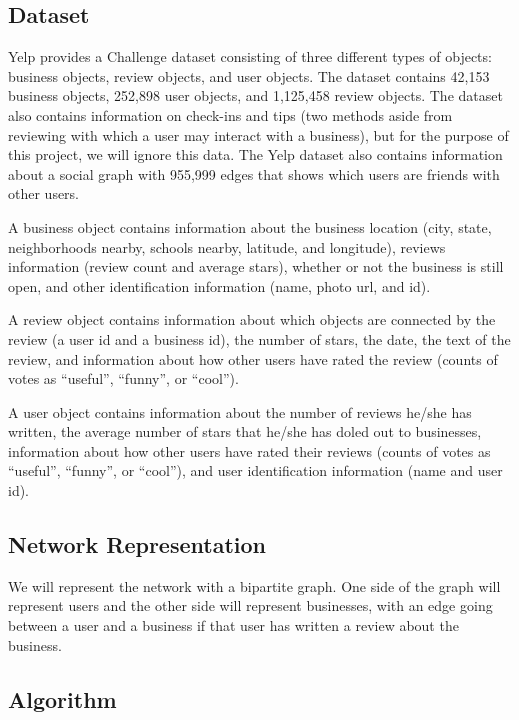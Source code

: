 \documentclass[11pt]{article}
\begin{document}
\subsection{Dataset}
Yelp provides a Challenge dataset consisting of three different types of objects: business objects, review objects, and user objects.  The dataset contains 42,153 business objects, 252,898 user objects, and 1,125,458 review objects.  The dataset also contains information on check-ins and tips (two methods aside from reviewing with which a user may interact with a business), but for the purpose of this project, we will ignore this data.  The Yelp dataset also contains information about a social graph with 955,999 edges that shows which users are friends with other users.\\
\par
A business object contains information about the business location (city, state, neighborhoods nearby, schools nearby, latitude, and longitude), reviews information (review count and average stars), whether or not the business is still open, and other identification information (name, photo url, and id).\\
\par
A review object contains information about which objects are connected by the review (a user id and a business id), the number of stars, the date, the text of the review, and information about how other users have rated the review (counts of votes as ``useful'', ``funny'', or ``cool'').\\
\par
A user object contains information about the number of reviews he/she has written, the average number of stars that he/she has doled out to businesses, information about how other users have rated their reviews (counts of votes as ``useful'', ``funny'', or ``cool''), and user identification information (name and user id).
\subsection{Network Representation}
We will represent the network with a bipartite graph. One side of the graph will represent users and the other side will represent businesses, with an edge going between a user and a business if that user has written a review about the business.
\subsection{Algorithm}
\end{document}
